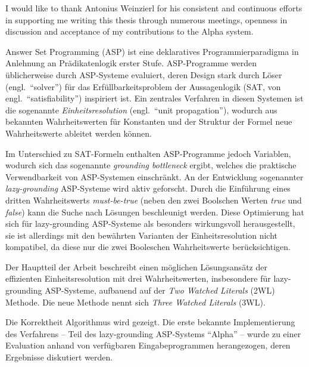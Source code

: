 \documentclass{vutinfth} %
\newcommand{\mbt}{must-be-true\xspace}
\begin{document}
\frontmatter %

\addstatementpage


\begin{acknowledgements*}
I would like to thank Antonius Weinzierl for his consistent and continuous efforts in supporting me writing this thesis through numerous meetings, openness in discussion and acceptance of my contributions to the Alpha system.
\end{acknowledgements*}


\begin{kurzfassung}
Answer Set Programming (ASP) ist eine deklaratives Programmierparadigma in Anlehnung an Prädikatenlogik erster Stufe. ASP-Programme werden üblicherweise durch ASP-Systeme evaluiert, deren Design stark durch Löser (engl.~\enquote{solver}) für das Erfüllbarkeitsproblem der Aussagenlogik (SAT, von engl.~\enquote{satisfiability}) inspiriert ist. Ein zentrales Verfahren in diesen Systemen ist die sogenannte \emph{Einheitsresolution} (engl.~\enquote{unit propagation}), wodurch aus bekannten Wahrheitswerten für Konstanten und der Struktur der Formel neue Wahrheitswerte ableitet werden können.

Im Unterschied zu SAT-Formeln enthalten ASP-Programme jedoch Variablen, wodurch sich das sogenannte \emph{grounding bottleneck} ergibt, welches die praktische Verwendbarkeit von ASP-Systemen einschränkt. An der Entwicklung sogenannter \emph{lazy-grounding} ASP-Systeme wird aktiv geforscht. Durch die Einführung eines dritten Wahrheitswerts \emph{\mbt} (neben den zwei Boolschen Werten \emph{true} und \emph{false}) kann die Suche nach Lösungen beschleunigt werden. Diese Optimierung hat sich für lazy-grounding ASP-Systeme als besonders wirkungsvoll herausgestellt, sie ist allerdings mit den bewährten Varianten der Einheitsresolution nicht kompatibel, da diese nur die zwei Booleschen Wahrheitswerte berücksichtigen.

Der Hauptteil der Arbeit beschreibt einen möglichen Lösungsansätz der effizienten Einheitsresolution mit drei Wahrheitswerten, insbesondere für lazy-grounding ASP-Systeme, aufbauend auf der \emph{Two Watched Literals} (2WL) Methode. Die neue Methode nennt sich \emph{Three Watched Literals} (3WL).

Die Korrektheit Algorithmus wird gezeigt. Die erste bekannte Implementierung des Verfahrens -- Teil des lazy-grounding ASP-Systems \enquote{Alpha} -- wurde zu einer Evaluation anhand von  verfügbaren Eingabeprogrammen herangezogen, deren Ergebnisse diskutiert werden.
\end{kurzfassung}
\end{document}
